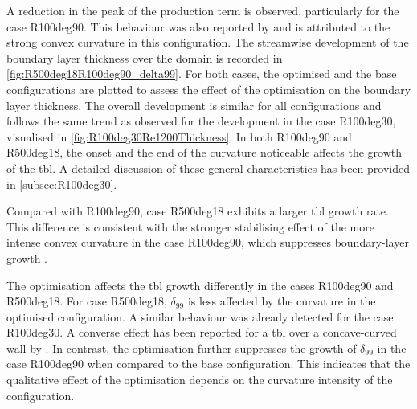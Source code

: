 A reduction in the peak of the production term is observed, particularly for the case R100deg90. This behaviour was also reported  by \citet{gillis_turbulent_1983} and  is attributed to the strong convex curvature in this configuration.
The streamwise development of the boundary layer thickness over the domain is recorded in \autoref{fig:R500deg18R100deg90_delta99}.
For both cases, the optimised and the base configurations are plotted to assess the effect of the optimisation on the boundary layer thickness.
The overall development is similar for all configurations and follows the same trend as observed for the development in the case R100deg30, visualised in \autoref{fig:R100deg30Re1200Thickness}.
In both  R100deg90 and R500deg18, the onset and the end of the curvature noticeable affects the growth of the \acrshort{tbl}.
A detailed discussion of these general characteristics has been provided in  \autoref{subsec:R100deg30}. 

Compared with R100deg90,  case R500deg18 exhibits  a larger \acrshort{tbl} growth rate. This difference is consistent with the stronger stabilising effect of the more intense convex curvature in the case R100deg90, which suppresses boundary-layer growth \citep{gillis_turbulent_1983,so_experiment_1973}.

The optimisation affects the \acrshort{tbl} growth differently in the cases R100deg90 and R500deg18.
For case R500deg18, $\delta_{99}$ is less affected by the curvature in the optimised configuration.
A similar behaviour was already detected for the case R100deg30.
A converse effect has been reported for a \acrshort{tbl} over a concave-curved wall by \citet{appelbaum_systematic_2025}.
In contrast, the optimisation further suppresses the growth of $\delta_{99}$ in the case R100deg90 when compared to the base configuration.
This indicates that the qualitative effect of the optimisation depends on the curvature intensity of the configuration.

